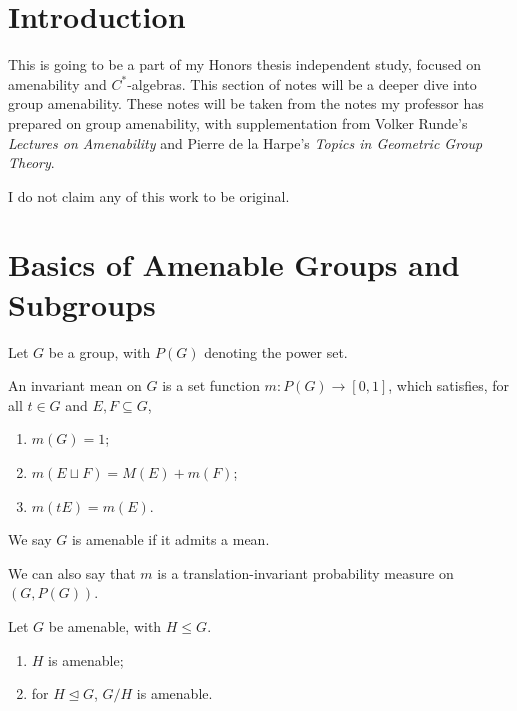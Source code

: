 \documentclass[10pt]{mypackage}
\begin{document}
\RaggedRight
\tableofcontents
\section{Introduction}%
This is going to be a part of my Honors thesis independent study, focused on amenability and $C^{\ast}$-algebras. This section of notes will be a deeper dive into group amenability. These notes will be taken from the notes my professor has prepared on group amenability, with supplementation from Volker Runde's \textit{Lectures on Amenability} and Pierre de la Harpe's \textit{Topics in Geometric Group Theory}.\newline

I do not claim any of this work to be original.
\section{Basics of Amenable Groups and Subgroups}%
Let $G$ be a group, with $P(G)$ denoting the power set.
\begin{definition}
  An invariant mean on $G$ is a set function $m\colon P(G)\rightarrow [0,1]$, which satisfies, for all $t\in G$ and $E,F\subseteq G$,
  \begin{enumerate}[(1)]
    \item $m(G) = 1$;
    \item $m\left(E\sqcup F\right) = M(E) + m(F)$;
    \item $m\left(tE\right) = m\left(E\right)$.
  \end{enumerate}
  We say $G$ is amenable if it admits a mean.\newline

  We can also say that $m$ is a translation-invariant probability measure on $\left(G,P(G)\right)$.
\end{definition}
\begin{proposition}
  Let $G$ be amenable, with $H\leq G$.
  \begin{enumerate}[(1)]
    \item $H$ is amenable;
    \item for $H\trianglelefteq G$, $G/H$ is amenable.
  \end{enumerate}
\end{proposition}
\end{document}
